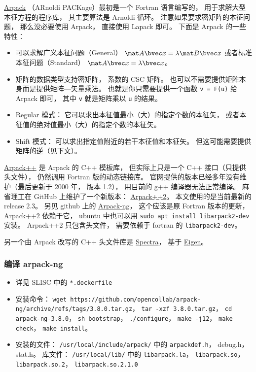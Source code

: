 

\href{https://www.caam.rice.edu/software/ARPACK/}{Arpack} （ARnoldi PACKage）最初是一个 Fortran 语言编写的， 用于求解大型本征方程的程序库， 其主要算法是 Arnoldi 循环。 注意如果要求密矩阵的本征问题， 那么没必要使用 Arpack， 直接使用 Lapack 即可。 下面是 Arpack 的一些特性：
\begin{itemize}
\item 可以求解广义本征问题（General） $\mat A\bvec x = \lambda \mat B\bvec x$ 或者标准本征问题（Standard） $\mat A\bvec x = \lambda \bvec x$。
\item 矩阵的数据类型支持密矩阵， 系数的 CSC 矩阵。 也可以不需要提供矩阵本身而是提供矩阵—矢量乘法。 也就是你只需要提供一个函数 \verb|v = F(u)| 给 Arpack 即可， 其中 \verb|v| 就是矩阵乘以 \verb|u| 的结果。
\item Regular 模式： 它可以求出本征值最小（大）的指定个数的本征矢， 或者本征值的绝对值最小（大）的指定个数的本征矢。
\item Shift 模式： 可以求出指定值附近的若干本征值和本征矢。 但这可能需要提供矩阵的逆（见下文）。
\end{itemize}

\href{http://www.ime.unicamp.br/~chico/arpack++/}{Arpack++} 是 Arpack 的 C++ 模板库， 但实际上只是一个 C++ 接口（只提供头文件）， 仍然调用 Fortran 版的动态链接库。 官网提供的版本已经多年没有维护（最后更新于 2000 年， 版本 1.2）， 用目前的 g++ 编译器无法正常编译。 麻省理工在 GitHub 上维护了一个新版本： \href{https://github.com/m-reuter/arpackpp}{Arpack++2}。 本文使用的是当前最新的 release 2.3。 另见 github 上的 \href{https://github.com/opencollab/arpack-ng}{Arpack-ng}， 这个应该是原 Fortran 版本的更新， Arpack++2 依赖于它， ubuntu 中也可以用 \verb|sudo apt install libarpack2-dev| 安装。 Arpack++2 只包含头文件， 需要依赖于 fortran 的 \verb|libarpack2-dev|。

另一个由 Arpack 改写的 C++ 头文件库是 \href{https://spectralib.org/}{Spectra}， 基于 \href{https://eigen.tuxfamily.org/index.php?title=Main_Page}{Eigen}。

\subsubsection{编译 arpack-ng}
\begin{itemize}
\item 详见 SLISC 中的 \verb|*.dockerfile|
\item 安装命令： \verb|wget https://github.com/opencollab/arpack-ng/archive/refs/tags/3.8.0.tar.gz|， \verb|tar -xzf 3.8.0.tar.gz|， \verb|cd arpack-ng-3.8.0|， \verb|sh bootstrap|， \verb|./configure|， \verb|make -j12|， \verb|make check|， \verb|make install|。
\item 安装的文件： \verb|/usr/local/include/arpack/| 中的 \verb|arpackdef.h|， debug.h， stat.h。 库文件： \verb|/usr/local/lib/| 中的 \verb|libarpack.la|， \verb|libarpack.so|， \verb|libarpack.so.2|， \verb|libarpack.so.2.1.0|
\end{itemize}

